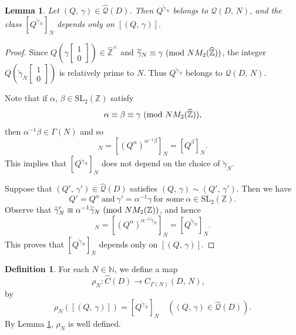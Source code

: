 \documentclass[reqno,11pt]{article}
\newcommand{\Mod}[1]{\ (\textup{mod}\ #1)}
\theoremstyle{plain} %
\newtheorem{lemma}[theorem]{\indent\sc Lemma}
\theoremstyle{definition} %
\newtheorem{definition}[theorem]{\indent\sc Definition}
\begin{document}
\begin{lemma}\label{rNwell}
Let $(Q,\,\gamma)\in\widehat{\mathcal{Q}}(D)$. Then
$Q^{\widetilde{\gamma}_N}$ belongs to $\mathcal{Q}(D,\,N)$, and the
class $[Q^{\widetilde{\gamma}_N}]_N$ depends only on
$[(Q,\,\gamma)]$.
\end{lemma}
\begin{proof}
Since $Q\left(\gamma\begin{bmatrix}1\\0\end{bmatrix}\right)\in\widehat{\mathbb{Z}}^\times$
and $\widetilde{\gamma}_N\equiv\gamma\Mod{NM_2(\widehat{\mathbb{Z}})}$, 
the integer $Q\left(\widetilde{\gamma}_N\begin{bmatrix}1\\0\end{bmatrix}\right)$ is relatively prime to $N$.
Thus $Q^{\widetilde{\gamma}_N}$ belongs to $\mathcal{Q}(D,\,N)$. 
\par
Note that 
if
$\alpha,\,\beta\in\mathrm{SL}_2(\mathbb{Z})$ satisfy
\begin{equation*}
\alpha\equiv\beta\equiv\gamma\Mod{NM_2(\widehat{\mathbb{Z}})}, 
\end{equation*}
then $\alpha^{-1}\beta\in\Gamma(N)$ and so
\begin{equation*}
[Q^\alpha]_N=[(Q^\alpha)^{\alpha^{-1}\beta}]_N=[Q^\beta]_N.
\end{equation*}
This implies that $[Q^{\widetilde{\gamma}_N}]_N$ does not
depend on the choice of $\widetilde{\gamma}_N$.
\par
Suppose that $(Q',\,\gamma')\in\widehat{\mathcal{Q}}(D)$ satisfies
$(Q,\,\gamma)\sim(Q',\,\gamma')$. Then we have
\begin{equation*}
Q'=Q^\alpha~\text{and}~\gamma'=\alpha^{-1}\gamma~\text{for some}~
\alpha\in\mathrm{SL}_2(\mathbb{Z}). 
\end{equation*}
Observe that
$\widetilde{\gamma}'_N\equiv\alpha^{-1}\widetilde{\gamma}_N
\Mod{NM_2(\mathbb{Z})}$,
and hence
\begin{equation*}
[Q'^{\widetilde{\gamma}_N'}]_N=[(Q^\alpha)^{\alpha^{-1}\widetilde{\gamma}_N}]_N=[Q^{\widetilde{\gamma}_N}]_N.
\end{equation*}
This proves that $[Q^{\widetilde{\gamma}_N}]_N$ depends only on $[(Q,\,\gamma)]$. 
\end{proof}

\begin{definition}
For each $N\in\mathbb{N}$, we define a map
\begin{equation*}
\rho_N:\widehat{C}(D)\rightarrow C_{\Gamma(N)}(D,\,N),
\quad
\end{equation*}
by 
\begin{equation*}
\rho_N([(Q,\,\gamma)])=[Q^{\widetilde{\gamma}_N}]_N\quad((Q,\,\gamma)
\in\widehat{\mathcal{Q}}(D)).
\end{equation*}
By Lemma \ref{rNwell}, $\rho_N$ is well defined.
\end{definition}
\end{document}
